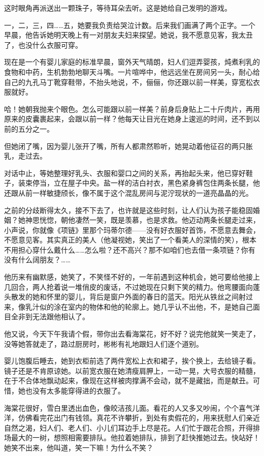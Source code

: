 \documentclass[lang=cn,newtx,12pt,scheme=chinese]{elegantbook}
\begin{document}
这时眼角再派送出一颗珠子，等待耳朵去听。这是她给自己发明的游戏。

一，二，三，四……五，她要我负责给哭泣计数。后来我们画满了两个正字。一个早晨，他告诉她明天晚上有一对朋友夫妇来探望。她说，我不愿意见客，我太丑了，也没什么衣服可穿。

现在是一个有婴儿家庭的标准早晨，窗外天气晴朗，妇人们逗弄婴孩，炖煮利乳的食物和中药，生机勃勃地聊天斗嘴。一片喧哗中，他远远坐在房间另一头，耐心给自己的九孔马丁靴穿鞋带，不抬头地说，不，俪俪，你还跟以前一样美，穿宽松衣服就好。

哈！她朝我抛来个眼色。怎么可能跟以前一样美？前身后身贴上二十斤肉片，再用原来的皮囊裹起来，会跟以前一样？他每天让目光在她身上逡巡的时间，还不到以前的五分之一。

但她闭了嘴，因为婴儿张开了嘴，所有人都肃然聆听，她晃动着他征召的两只胀乳，走过去。

对话中止，等她整理好乳头、衣服和婴口之间的关系，再抬起头来，他已穿好鞋子，装束停当，立在屋子中央。盐一样的洁白衬衣，黑色紧身裤包住两条长腿，他还跟从前一样敏捷颀长，像不属于这个混乱房间与泥泞现状的一道亮晶晶的光。

之前的分歧断得太久，接不下去了，也许就是这些时刻，让人们认为孩子能稳固婚姻？她神思恍惚，朝他凄然一笑，既是羡慕，也是求救。他迈动两条长腿走过来，小声说，你就像《项链》里那个玛蒂尔德——没有好衣服好首饰，不愿意去舞会，不愿意见客。其实真正的美人（他凝视她，笑出了一个看美人的深情的笑），根本不用担心穿什么戴什么……怎么啦？还不高兴？那不如咱们也去借一条项链？你有没有什么阔朋友？……

他历来有幽默感，她笑了，不笑怪不好的，一年前遇到这种机会，她可要给他接上几回合，两人抢着说一堆俏皮的废话，不过她现在只剩下笑的精力。他弯腰面向蓬头散发的她和怀里的婴儿，背后是窗户外面的春日的蓝天。阳光从铁丝之间射过来，像乳汁似的涂在室内的物体和他的轮廓上。她几乎认不出他，不，是她自己面目全非到无法跟他相认了。

他又说，今天下午我请个假，带你出去看海棠花，好不好？说完他就笑一笑走了，没等她答就走了，路过厨房时，彬彬有礼地跟妇人们逐个道别。

婴儿饱腹后睡去，她到衣柜前选了两件宽松上衣和裙子，挨个换上，去给镜子看。镜子还是不肯原谅她。以前宽衣服在她清瘦肩胛上，一动一晃，大号衣服的精髓，在于不合体地飘动起来，像现在这样被肉撑满不会动，就不是藏拙，而是献丑。可惜，她也没有太多能穿得进的衣服了。

海棠花很好，雪白里透出血色，像皎洁孩儿面。看花的人又多又吵闹，个个喜气洋洋，仿佛看完花出门有钱领。真花不许攀折，到处有卖假花的，用来抚慰人们亲近自然之渴，妇人们、老人们、小儿们耳边手上尽是花。人们忙于跟花合照，开得排场最大的一树，想照相需要排队。他拉着她排队，排到了赶快推她过去。快站好！她笑不出来，他叫道，笑一下嘛！为什么不笑？
\end{document}
